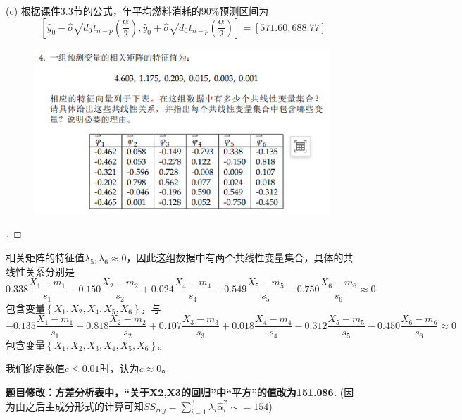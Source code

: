 \documentclass[cn,hazy,green,12pt,normal]{elegantnote}
\numberwithin{equation}{section}
\numberwithin{subsection}{section}
\begin{document}
(c) 根据课件3.3节的公式，年平均燃料消耗的90\%预测区间为
$$
\left[ \hat{y}_0-\hat{\sigma}\sqrt{d_0}\mathit{t}_{n-p}(\frac{\alpha}{2}),\hat{y}_0+\hat{\sigma}\sqrt{d_0}\mathit{t}_{n-p}(\frac{\alpha}{2}) \right] = \left[ 571.60,688.77 \right]
$$


\newpage


\begin{homework}   
\end{homework}
\begin{figure}[!htbp]
    \centering
    \includegraphics[width=30em]{image/hw5_4.png}
\end{figure}

\begin{proof}[\solutionname]
\end{proof}

相关矩阵的特征值$\lambda_5, \lambda_6 \approx 0$，因此这组数据中有两个共线性变量集合，具体的共线性关系分别是
$$
0.338 \frac{X_1 - m_1}{s_1} - 0.150 \frac{X_2 - m_2}{s_2} + 0.024 \frac{X_4 - m_4}{s_4} + 0.549 \frac{X_5 - m_5}{s_5} - 0.750 \frac{X_6 - m_6}{s_6} \approx 0
$$
包含变量$\left\{ X_1,X_2,X_4,X_5,X_6 \right\}$，与
$$
-0.135 \frac{X_1 - m_1}{s_1} + 0.818 \frac{X_2 - m_2}{s_2} + 0.107 \frac{X_3 - m_3}{s_3} + 0.018 \frac{X_4 - m_4}{s_4} - 0.312 \frac{X_5 - m_5}{s_5} - 0.450 \frac{X_6 - m_6}{s_6} \approx 0
$$
包含变量$\left\{ X_1,X_2,X_3,X_4,X_5,X_6 \right\}$。

\begin{note}
    我们约定数值$c \leq 0.01$时，认为$c \approx 0$。
\end{note}


\newpage


\begin{homework}   
\end{homework}
\textbf{题目修改：方差分析表中，“关于X2,X3的回归”中“平方”的值改为151.086.}
(因为由之后主成分形式的计算可知$SS_{reg} = \sum_{i=1}^{3} \lambda_i \hat{\alpha}_i^2 \sim=154 $)
\end{document}
